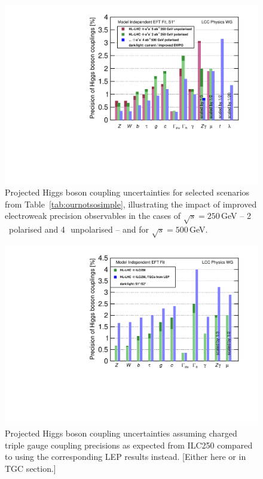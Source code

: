 \begin{figure}
\begin{center}
\includegraphics[width=0.7\hsize]{chapters/figures/DeltaHXX_SM_ILC_EWPO_MI.pdf}
\caption{Projected Higgs boson coupling uncertainties for selected scenarios from Table~\ref{tab:ournotsosimple}, illustrating the impact of improved electroweak precision observables in the cases of $\sqrt{s}=250$\,GeV -- 2\,\iab\ polarised and 4\,\iab\ unpolarised -- and for $\sqrt{s}=500$\,GeV.}
\label{fig:ournotsosimple}
\end{center}
\end{figure}

\begin{figure}
\begin{center}
\includegraphics[width=0.7\hsize]{chapters/figures/DeltaHXX_SM_ILC_TGC_MI.pdf}
\caption{Projected Higgs boson coupling uncertainties assuming charged triple gauge coupling precisions as expected from ILC250 compared to using the corresponding LEP results instead. {\color{red}[Either here or in TGC section.]}}
\label{fig:oursimple}
\end{center}
\end{figure}



